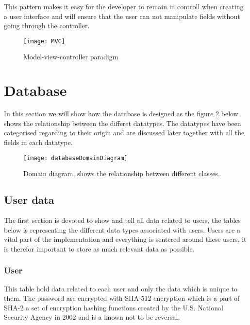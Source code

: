 This pattern makes it easy for the developer to remain in controll when creating a user interface and will ensure that the user can not manipulate fields without going through the controller.

\begin{figure}[htpb!]
    \centering
        \texttt{[image: MVC]}
    \caption{Model-view-controller paradigm}
    \label{mvc-paradigm}
\end{figure}
\newpage

\section{Database}
In this section we will show how the database is designed as the figure \ref{databaseDomainDiagram} below shows the relationship between the differet datatypes. The datatypes have been categorised regarding to their origin and are discussed later together with all the fields in each datatype.

\begin{figure}[!htpb]
\centering
	\texttt{[image: databaseDomainDiagram]}
\caption{Domain diagram, shows the relationship between different classes.}
\label{databaseDomainDiagram}
\end{figure}
\newpage

\subsection{User data}
The first section is devoted to show and tell all data related to users, the tables below is representing the different data types associated with users. Users are a vital part of the implementation and everything is sentered around these users, it is therefor important to store as much relevant data as possible. \\

\subsubsection*{User}
This table hold data related to each user and only the data which is unique to them.
The password are encrypted with SHA-512 encryption which is a part of SHA-2 a set of encryption hashing functions created by the U.S. National Security Agency in 2002 and is a known not to be reversal.\\

